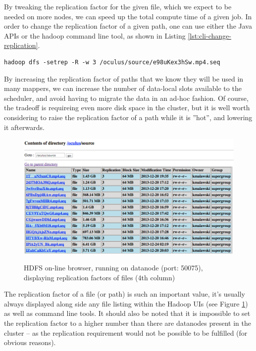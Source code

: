 By tweaking the replication factor for the given file, which we expect to be needed on more nodes, we can speed up the total compute time of a given job. In order to change the replication factor of a given path, one can use either the Java APIs or the hadoop command line tool, as shown in Listing \ref{lst:cli-change-replication}.

\begin{lstlisting}[caption={Explicitly changing the replication factor on a path using command line tools}, label={lst:cli-change-replication}]
hadoop dfs -setrep -R -w 3 /oculus/source/e98uKex3hSw.mp4.seq
\end{lstlisting}

By increasing the replication factor of paths that we know they will be used in many mappers, we can increase the number of data-local slots available to the scheduler, and avoid having to migrate the data in an ad-hoc fashion. Of course, the tradeoff is requireing even more disk space in the cluster, but it is well worth considering to raise the replication factor of a path while it is ''hot'', and lowering it afterwards.

\begin{figure}
  \centering
  \includegraphics[width=\textwidth]{img/hadoop/hdfs_show-replication}
  \label{fig:hdfs-replication-factors}
  \caption{HDFS on-line browser, running on datanode (port: 50075), displaying replication factors of files (4th column)}
\end{figure}

The replication factor of a file (or path) is such an important value, it's usually always displayed along side any file listing within the Hadoop UIs (see Figure \ref{fig:hdfs-replication-factors}) as well as command line tools. It should also be noted that it is impossible to set the replication factor to a higher number than there are datanodes present in the cluster -- as the replication requirement would not be possible to be fulfilled (for obvious reasons).


